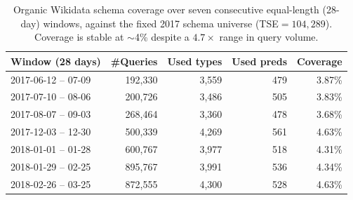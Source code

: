 \documentclass[sw]{iosart2x}
\begin{document}
\begin{table}[ht]
\centering
\caption{Organic Wikidata schema coverage over seven consecutive equal-length (28-day) windows, against the fixed 2017 schema universe (TSE${=}104{,}289$). Coverage is stable at $\sim$4\% despite a $4.7\times$ range in query volume.}
\label{tab:temporaltraj}
\begin{tabular}{l|r|r|r|r}
\hline
Window (28 days) & \#Queries & Used types & Used preds & Coverage \\
\hline
2017-06-12 -- 07-09 & 192,330 & 3,559 & 479 & 3.87\% \\
2017-07-10 -- 08-06 & 200,726 & 3,486 & 505 & 3.83\% \\
2017-08-07 -- 09-03 & 268,464 & 3,360 & 478 & 3.68\% \\
2017-12-03 -- 12-30 & 500,339 & 4,269 & 561 & 4.63\% \\
2018-01-01 -- 01-28 & 600,767 & 3,977 & 518 & 4.31\% \\
2018-01-29 -- 02-25 & 895,767 & 3,991 & 536 & 4.34\% \\
2018-02-26 -- 03-25 & 872,555 & 4,300 & 528 & 4.63\% \\
\hline
\end{tabular}
\end{table}
\end{document}

